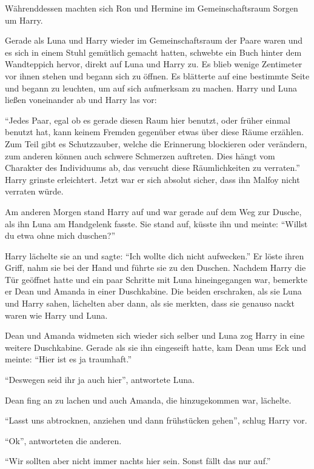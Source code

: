 Währenddessen machten sich Ron und Hermine im Gemeinschaftsraum Sorgen um Harry.

\begin{rueckblick}
Gerade als Luna und Harry wieder im Gemeinschaftsraum der Paare waren und es sich in einem Stuhl gemütlich gemacht hatten, schwebte ein Buch hinter dem Wandteppich hervor, direkt auf Luna und Harry zu. Es blieb wenige Zentimeter vor ihnen stehen und begann sich zu öffnen. Es blätterte auf eine bestimmte Seite und begann zu leuchten, um auf sich aufmerksam zu machen. Harry und Luna ließen voneinander ab und Harry las vor:

\enquote{Jedes Paar, egal ob es gerade diesen Raum hier benutzt, oder früher einmal benutzt hat, kann keinem Fremden gegenüber etwas über diese Räume erzählen. Zum Teil gibt es Schutzzauber, welche die Erinnerung blockieren oder verändern, zum anderen können auch schwere Schmerzen auftreten. Dies hängt vom Charakter des Individuums ab, das versucht diese Räumlichkeiten zu verraten.} Harry grinste erleichtert. Jetzt war er sich absolut sicher, dass ihn Malfoy nicht verraten würde.
\end{rueckblick}

Am anderen Morgen stand Harry auf und war gerade auf dem Weg zur Dusche, als ihn Luna am Handgelenk fasste. Sie stand auf, küsste ihn und meinte: \enquote{Willst du etwa ohne mich duschen?}

Harry lächelte sie an und sagte: \enquote{Ich wollte dich nicht aufwecken.} Er löste ihren Griff, nahm sie bei der Hand und führte sie zu den Duschen. Nachdem Harry die Tür geöffnet hatte und ein paar Schritte mit Luna hineingegangen war, bemerkte er Dean und Amanda in einer Duschkabine. Die beiden erschraken, als sie Luna und Harry sahen, lächelten aber dann, als sie merkten, dass sie genauso nackt waren wie Harry und Luna.

Dean und Amanda widmeten sich wieder sich selber und Luna zog Harry in eine weitere Duschkabine. Gerade als sie ihn eingeseift hatte, kam Dean ums Eck und meinte: \enquote{Hier ist es ja traumhaft.}

\enquote{Deswegen seid ihr ja auch hier}, antwortete Luna.

Dean fing an zu lachen und auch Amanda, die hinzugekommen war, lächelte.

\enquote{Lasst uns abtrocknen, anziehen und dann frühstücken gehen}, schlug Harry vor.

\enquote{Ok}, antworteten die anderen.

\enquote{Wir sollten aber nicht immer nachts hier sein. Sonst fällt das nur auf.}

